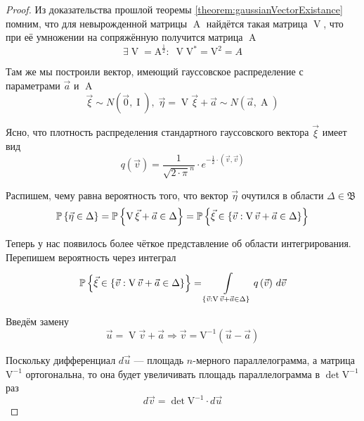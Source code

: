 \begin{proof}
    Из доказательства прошлой теоремы \ref{theorem:gaussianVectorExistance}
    помним, что для невырожденной матрицы $\operatorname{A}$ найдётся такая
    матрица $\operatorname{V}$, что при её умножении на сопряжённую получится
    матрица $\operatorname{A}$
    $$\exists \operatorname{V} = \operatorname{A^{\frac{1}{2}}}:\;
        \operatorname{V}\operatorname{V^*} = \operatorname{V^2} = A$$

    Там же мы построили вектор, имеющий гауссовское распределение с параметрами
    $\vec{a}$ и $\operatorname{A}$
    $$\vec{\xi} \sim N\left( \vec{0}, \operatorname{I} \right),\;
        \vec{\eta} = \operatorname{V} \vec{\xi} +\vec{a}
            \sim N\left( \vec{a}, \operatorname{A} \right)$$

    Ясно, что плотность распределения стандартного гауссовского вектора
    $\vec{\xi}$ имеет вид
    $$q\left( \vec{v} \right)
        = \frac{1}{\sqrt{2 \cdot \pi}^n}
            \cdot e^{-\frac{1}{2} \cdot \left( \vec{v}, \vec{v} \right)}$$

    Распишем, чему равна вероятность того, что вектор $\vec{\eta}$ очутился
    в области $\Delta \in \mathfrak{B}$
    \begin{equation}\label{eq:gaussVectorProbabilityStart}
        \Probability{\vec{\eta} \in \Delta}
        = \Probability{\operatorname{V} \vec{\xi} + \vec{a} \in \Delta}
        = \Probability{\vec{\xi} \in \left\{ \vec{v}:
            \operatorname{V} \vec{v} + \vec{a} \in \Delta \right\}}
    \end{equation}

    Теперь у нас появилось более чёткое представление об области интегрирования.
    Перепишем вероятность через интеграл
    $$\Probability{\vec{\xi} \in \left\{ \vec{v}:
            \operatorname{V} \vec{v} + \vec{a} \in \Delta \right\}}
        = \integrall{\left\{ \vec{v}: \operatorname{V} \vec{v} + \vec{a}
            \in \Delta \right\}}{d\vec{v}}{q\left( \vec{v} \right)}$$

    Введём замену
    $$\vec{u} = \operatorname{V} \vec{v} + \vec{a}
        \Rightarrow
        \vec{v} = \operatorname{V^{-1}} \left( \vec{u} - \vec{a} \right)$$

    Поскольку дифференциал $d\vec{u}$ --- площадь $n$-мерного параллелограмма,
    а матрица $\operatorname{V^{-1}}$ ортогональна, то она будет увеличивать
    площадь параллелограмма в $\det{\operatorname{V^{-1}}}$ раз
    $$d\vec{v} = \det{\operatorname{V^{-1}}} \cdot d\vec{u}$$


\end{proof}
